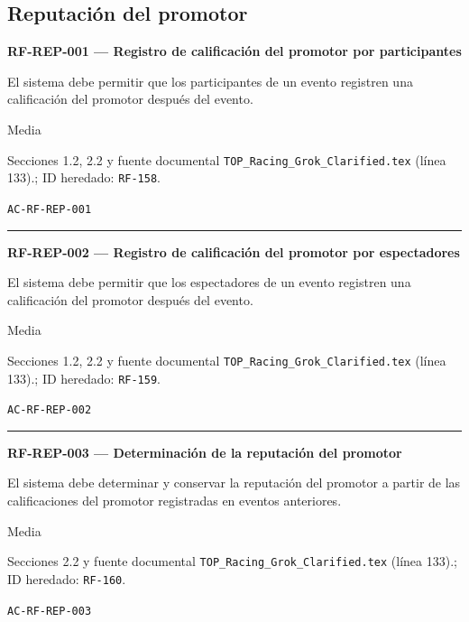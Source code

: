 \documentclass[10pt,letterpaper]{article}
\begin{document}
\subsection{Reputación del promotor}
\noindent\textbf{RF-REP-001 --- Registro de calificación del promotor por participantes}\par
\begin{description}[style=nextline,leftmargin=3.15cm,labelwidth=2.8cm,font=\normalfont\bfseries]
\item[Obligación] El sistema debe permitir que los participantes de un evento registren una calificación del promotor después del evento.
\item[Prioridad] Media
\item[Procedencia] Secciones 1.2, 2.2 y fuente documental \texttt{TOP\_Racing\_Grok\_Clarified.tex} (línea 133).; ID heredado: \texttt{RF-158}.
\item[Verificación] \texttt{AC-RF-REP-001}
\end{description}
\vspace{0.25em}\hrule\vspace{0.65em}
\noindent\textbf{RF-REP-002 --- Registro de calificación del promotor por espectadores}\par
\begin{description}[style=nextline,leftmargin=3.15cm,labelwidth=2.8cm,font=\normalfont\bfseries]
\item[Obligación] El sistema debe permitir que los espectadores de un evento registren una calificación del promotor después del evento.
\item[Prioridad] Media
\item[Procedencia] Secciones 1.2, 2.2 y fuente documental \texttt{TOP\_Racing\_Grok\_Clarified.tex} (línea 133).; ID heredado: \texttt{RF-159}.
\item[Verificación] \texttt{AC-RF-REP-002}
\end{description}
\vspace{0.25em}\hrule\vspace{0.65em}
\noindent\textbf{RF-REP-003 --- Determinación de la reputación del promotor}\par
\begin{description}[style=nextline,leftmargin=3.15cm,labelwidth=2.8cm,font=\normalfont\bfseries]
\item[Obligación] El sistema debe determinar y conservar la reputación del promotor a partir de las calificaciones del promotor registradas en eventos anteriores.
\item[Prioridad] Media
\item[Procedencia] Secciones 2.2 y fuente documental \texttt{TOP\_Racing\_Grok\_Clarified.tex} (línea 133).; ID heredado: \texttt{RF-160}.
\item[Verificación] \texttt{AC-RF-REP-003}
\end{description}
\end{document}

